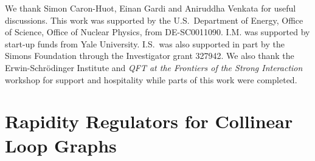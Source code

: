 \documentclass[letterpaper,11pt]{article}
\begin{document}
\begin{acknowledgments}
We thank Simon Caron-Huot, Einan Gardi and Aniruddha Venkata for useful discussions. 
This work was supported by the U.S.~Department of Energy, Office of Science, Office of Nuclear Physics, from DE-SC0011090. I.M. was supported by start-up funds from Yale University. I.S.~was also supported in part by the Simons Foundation through the Investigator grant 327942. We also thank the Erwin-Schr\"odinger Institute and {\it QFT at the Frontiers of the Strong Interaction} workshop for support and hospitality while parts of this work were completed.
\end{acknowledgments}

\appendix

\section{Rapidity Regulators for Collinear Loop Graphs}
\label{app:regulator}
\end{document}
